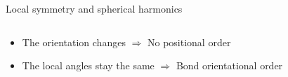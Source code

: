 \begin{frame}[label=local_sym_sh]{Local symmetry and spherical harmonics}
\begin{columns}
	\end{columns}
	\begin{itemize}
		\item The orientation changes $\Rightarrow$ No positional order
		\item The local angles stay the same $\Rightarrow$ Bond orientational order
	\end{itemize}
	{\footnotesize\citet{steinhardt1983boo}}
\end{frame}


